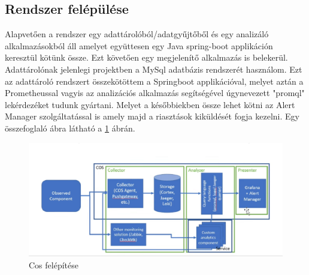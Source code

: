 \subsection{Rendszer felépülése}
Alapvetően a rendszer egy adattárolóból/adatgyűjtőből és egy analizáló alkalmazásokból áll amelyet együttesen egy Java spring-boot applikáción keresztül kötünk össze. Ezt követően egy megjelenítő alkalmazás is belekerül.
Adattárolónak jelenlegi projektben a MySql adatbázis rendszerét használom.
Ezt az adattároló rendszert összekötöttem a Springboot applikációval, melyet aztán a Prometheussal vagyis az analizációs alkalmazás segítségével úgynevezett "promql" lekérdezéket tudunk gyártani. 
Melyet a későbbiekben össze lehet kötni az Alert Manager szolgáltatással is amely majd a riasztások kiküldését fogja kezelni.
Egy összefoglaló ábra látható a \ref{fig:cos_fel} ábrán.

\begin{figure}[H]
	\centering
	\includegraphics[width=1\linewidth]{img/rajz.png}
	\caption{Cos felépítése}
	\label{fig:cos_fel}
\end{figure}

